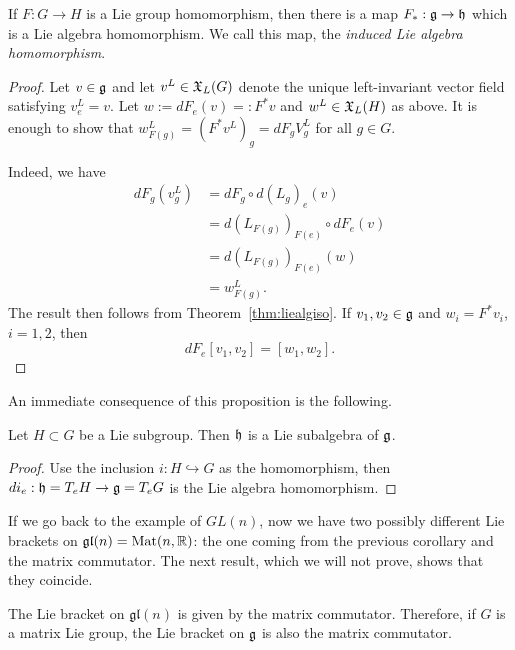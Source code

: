 \begin{proposition}
  If $F: G\to H$ is a Lie group homomorphism, then there is a map $F_*:\mathfrak{g}\to\mathfrak{h}$ which is a Lie algebra homomorphism. We call this map, the \emph{induced Lie algebra homomorphism}.
\end{proposition}
\begin{proof}
  Let $v\in\mathfrak{g}$ and let $v^L\in\mathfrak{X}_L(G)$ denote the unique left-invariant vector field satisfying $v^L_e = v$.
  Let $w := dF_e(v) =: F^*v$ and $w^L\in\mathfrak{X}_L(H)$ as above.
  It is enough to show that $w^L_{F(g)} = (F^*v^L)_g = dF_g V^L_g$ for all $g\in G$.

  Indeed, we have
  \begin{align}
    dF_g(v^L_g) &= dF_g\circ d(L_g)_e(v) \\
    &=d(L_{F(g)})_{F(e)}\circ dF_e(v) \\
    &=d(L_{F(g)})_{F(e)}(w) \\
    &=w^L_{F(g)}.
  \end{align}
  The result then follows from Theorem~\ref{thm:liealgiso}.
  If $v_1,v_2 \in\mathfrak{g}$ and $w_i=F^*v_i$, $i=1,2$, then
  \begin{equation}
    dF_e[v_1,v_2] = [w_1, w_2].
  \end{equation}
\end{proof}

An immediate consequence of this proposition is the following.
\begin{corollary}
  Let $H\subset G$ be a Lie subgroup.
  Then $\mathfrak{h}$ is a Lie subalgebra of $\mathfrak{g}$.
\end{corollary}
\begin{proof}
  Use the inclusion $i:H\hookrightarrow G$ as the homomorphism, then $di_e:\mathfrak{h} = T_eH\to \mathfrak{g} = T_eG$ is the Lie algebra homomorphism.
\end{proof}

If we go back to the example of $GL(n)$, now we have two possibly different Lie brackets on $\mathfrak{gl}(n)=\mathrm{Mat}(n, \mathbb{R})$: the one coming from the previous corollary and the matrix commutator.
The next result, which we will not prove, shows that they coincide.

\begin{proposition}
  The Lie bracket on $\mathfrak{gl}(n)$ is given by the matrix commutator.
  Therefore, if $G$ is a matrix Lie group, the Lie bracket on $\mathfrak{g}$ is also the matrix commutator.
\end{proposition}

